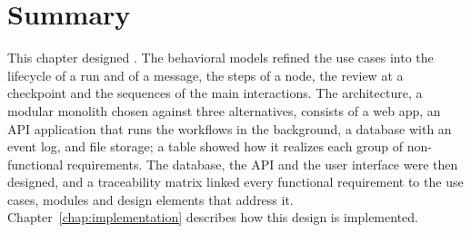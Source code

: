 \section{Summary}
\label{sec:sd-summary}
This chapter designed \sysname{}. The behavioral models refined the use cases into the lifecycle of a run and of a message, the steps of a node, the review at a checkpoint and the sequences of the main interactions. The architecture, a modular monolith chosen against three alternatives, consists of a web app, an API application that runs the workflows in the background, a database with an event log, and file storage; a table showed how it realizes each group of non-functional requirements. The database, the API and the user interface were then designed, and a traceability matrix linked every functional requirement to the use cases, modules and design elements that address it. Chapter~\ref{chap:implementation} describes how this design is implemented.
